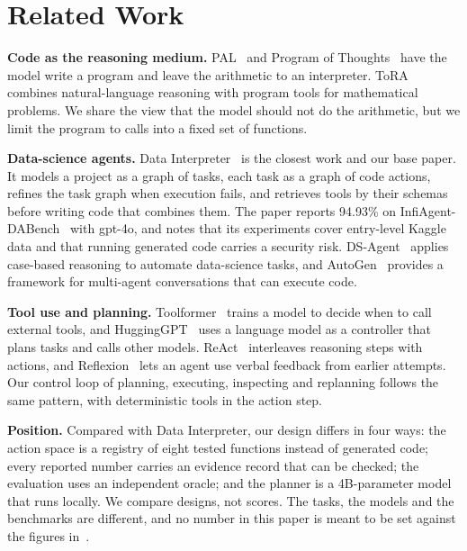 \section{Related Work}
\textbf{Code as the reasoning medium.} PAL~\cite{gao2022pal} and Program of Thoughts~\cite{chen2022pot} have the model write a program and leave the arithmetic to an interpreter. ToRA~\cite{gou2023tora} combines natural-language reasoning with program tools for mathematical problems. We share the view that the model should not do the arithmetic, but we limit the program to calls into a fixed set of functions.

\textbf{Data-science agents.} Data Interpreter~\cite{hong2024datainterpreter} is the closest work and our base paper. It models a project as a graph of tasks, each task as a graph of code actions, refines the task graph when execution fails, and retrieves tools by their schemas before writing code that combines them. The paper reports 94.93\% on InfiAgent-DABench~\cite{hu2024dabench} with gpt-4o, and notes that its experiments cover entry-level Kaggle data and that running generated code carries a security risk. DS-Agent~\cite{guo2024dsagent} applies case-based reasoning to automate data-science tasks, and AutoGen~\cite{wu2023autogen} provides a framework for multi-agent conversations that can execute code.

\textbf{Tool use and planning.} Toolformer~\cite{schick2023toolformer} trains a model to decide when to call external tools, and HuggingGPT~\cite{shen2023hugginggpt} uses a language model as a controller that plans tasks and calls other models. ReAct~\cite{yao2022react} interleaves reasoning steps with actions, and Reflexion~\cite{shinn2023reflexion} lets an agent use verbal feedback from earlier attempts. Our control loop of planning, executing, inspecting and replanning follows the same pattern, with deterministic tools in the action step.

\textbf{Position.} Compared with Data Interpreter, our design differs in four ways: the action space is a registry of eight tested functions instead of generated code; every reported number carries an evidence record that can be checked; the evaluation uses an independent oracle; and the planner is a 4B-parameter model that runs locally. We compare designs, not scores. The tasks, the models and the benchmarks are different, and no number in this paper is meant to be set against the figures in~\cite{hong2024datainterpreter}.
